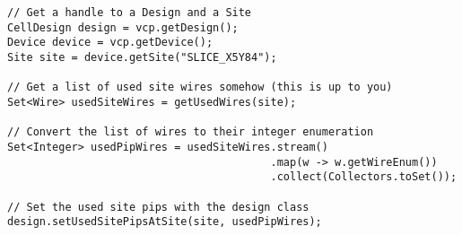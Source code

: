 \begin{lstlisting}[caption=Configuring Site Pips,
label=code:sitePips]
// Get a handle to a Design and a Site
CellDesign design = vcp.getDesign();
Device device = vcp.getDevice();
Site site = device.getSite("SLICE_X5Y84");

// Get a list of used site wires somehow (this is up to you)
Set<Wire> usedSiteWires = getUsedWires(site);

// Convert the list of wires to their integer enumeration
Set<Integer> usedPipWires = usedSiteWires.stream()
										 .map(w -> w.getWireEnum())
										 .collect(Collectors.toSet());

// Set the used site pips with the design class
design.setUsedSitePipsAtSite(site, usedPipWires);

\end{lstlisting}
